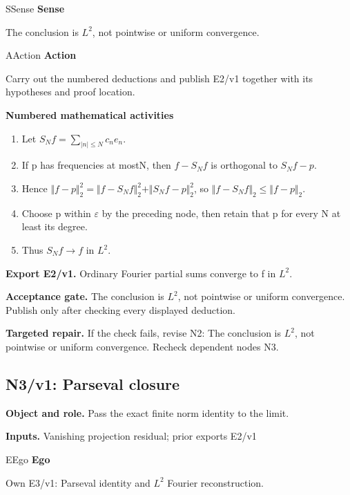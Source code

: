 \documentclass[preprint,12pt,aps,pra,showkeys,amsmath,amssymb,superscriptaddress,floatfix]{revtex4-2}
\theoremstyle{definition}
\theoremstyle{remark}
\newcommand{\mmfaculty}[3]{%
 \begin{mmfacultybox}{#1}{#2}
 {\sffamily\bfseries\color{MMBlue}#2}\par\smallskip #3
 \end{mmfacultybox}}
\newcommand{\field}[2]{\par\smallskip\noindent\textbf{#1.} #2\par}
\begin{document}
\mmfaculty{S}{Sense}{The conclusion is \(L^{2}\), not pointwise or uniform convergence.}

\mmfaculty{A}{Action}{Carry out the numbered deductions and publish E2/v1 together with its
hypotheses and proof location.}

\smallskip\noindent\textbf{Numbered mathematical activities}

\begin{enumerate}[label=N2.\arabic*,leftmargin=3.4em]

\item Let \(S_Nf=\sum _{|n|\le N}c_ne_n\).

\item If p has frequencies at mostN, then \(f-S_Nf\) is orthogonal to
\(S_Nf-p\).

\item Hence
\(\Vert f-p\Vert _{2}^{2}=\Vert f-S_Nf\Vert _{2}^{2}+\Vert S_Nf-p\Vert _{2}^{2}\),
so \(\Vert f-S_Nf\Vert _{2}\le \Vert f-p\Vert _{2}\).

\item Choose p within \(\varepsilon\) by the preceding node, then retain that
p for every N at least its degree.

\item Thus \(S_Nf\to f\) in \(L^{2}\).

\end{enumerate}

\field{Export E2/v1}{Ordinary Fourier partial sums converge to f in \(L^{2}\).}

\field{Acceptance gate}{The conclusion is \(L^{2}\), not pointwise or uniform convergence.
Publish only after checking every displayed deduction.}

\field{Targeted repair}{If the check fails, revise N2: The conclusion is \(L^{2}\), not
pointwise or uniform convergence. Recheck dependent nodes N3.}

\clearpage

\subsection{N3/v1: Parseval closure}

\field{Object and role}{Pass the exact finite norm identity to the limit.}

\field{Inputs}{Vanishing projection residual; prior exports E2/v1}

\mmfaculty{E}{Ego}{Own E3/v1: Parseval identity and \(L^{2}\) Fourier reconstruction.}
\end{document}
